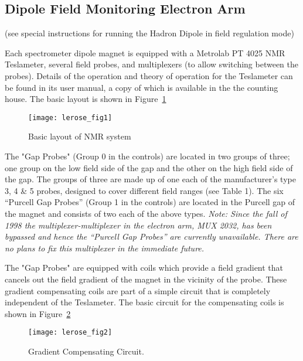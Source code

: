 \subsection{ Dipole Field Monitoring Electron Arm}

\noindent (see special instructions for running the Hadron Dipole in field 
regulation mode)


Each spectrometer dipole magnet is equipped with a Metrolab PT 4025 
NMR Teslameter, several field probes, and multiplexers (to allow switching 
between the probes).  Details of the operation and theory of operation 
for the Teslameter can be found in its user manual, 
a copy of which is available in the the counting house.
The basic layout is shown in Figure~\ref{fig:nmrbasic}


\begin{figure}
\begin{center}
\texttt{[image: lerose\_fig1]}
{\linespread{1.}
\caption[Spectrometers: NMR System Layout]{Basic layout of NMR system}
\label{fig:nmrbasic}}
\end{center}
\end{figure}


 The "Gap Probes" (Group 0 in the controls) are located in two groups 
of three; one group on the low field side of the gap and the other on the high 
field side of the gap.  The groups of three are made up of one each of 
the manufacturer's type 3, 4 \& 5 probes, designed to cover different 
field ranges (see Table 1).  The six ``Purcell Gap Probes'' (Group 1 in 
the controls) are located in the Purcell gap of the magnet 
and consists of two each of the above types. {\em Note: Since
the fall of 1998 the multiplexer-multiplexer in the electron arm,
MUX 2032, has been bypassed and hence the ``Purcell Gap Probes'' are currently
unavailable. There are no plans to fix this multiplexer in the
immediate future.}

 The "Gap Probes" are equipped with coils which provide a field 
gradient that cancels out the field gradient of the magnet in the vicinity of 
the probe.  These gradient compensating coils are part of a simple circuit 
that is completely independent of the Teslameter.  The basic circuit for 
the compensating coils is shown in Figure~\ref{fig:nmrcir}


\begin{figure}
\begin{center}
\texttt{[image: lerose\_fig2]}
{\linespread{1.}
\caption[Spectrometers: NMR Gradient Compensation]{Gradient Compensating Circuit.}
\label{fig:nmrcir}}
\end{center}
\end{figure}


